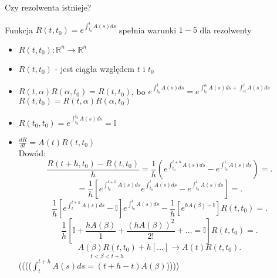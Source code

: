 \documentclass[../main.tex]{subfiles}
\begin{document}
    \begin{pytanie}
        Czy rezolwenta istnieje?
    \end{pytanie}
    Funkcja $R(t,t_0) = e^{\int_{t_0}^t A(s) ds}$ spełnia warunki $1-5$ dla rezolwenty
    \begin{itemize}
        \item $R(t,t_0): \mathbb{R}^n\to\mathbb{R}^n$
        \item $R(t,t_0)$ - jest ciągła względem $t$ i $t_0$
        \item $R(t,\alpha)R(\alpha,t_0) = R(t,t_0)$, bo $e^{\int_{t_0}^t A(s)d s} = e^{\int_{t_0}^\alpha A(s)d s+\int_{\alpha}^t A(s)d s}$\\
            $R(t,t_0) = R(t,\alpha)R(\alpha,t_0)$
        \item $R(t_0,t_0) = e^{\int_{t_0}^{t_0}A(s)d s} = \mathbb{I}$
        \item $\frac{dR}{dt}=A(t)R(t,t_0)$\\
            Dowód:
            \[
                \frac{R(t+h,t_0) -R(t,t_0)}{h} = \frac{1}{h}\left(e^{\int_{t_0}^{t+h}A(s)d s} - e^{\int_{t_0}^{t}A(s)d s}\right) =
            .\]
            \[
                =\frac{1}{h}\left[ e^{\int_{t_0}^{t+h}A(s)d s}e^{\int_{t_0}^{t}A(s)d s}-e^{\int_{t_0}^{t}A(s)d s} \right] =
            .\]
            \[
                \frac{1}{h}\left[ e^{\int_{t}^{t+h}A(s)d s}-\mathbb{I} \right] e^{\int_{t_0}^t A(s)d s} - \frac{1}{h}\left[ e^{hA(\beta) - \mathbb{I}} \right] R(t,t_0) =
            .\]
            \[
                \frac{1}{h}\left[ \mathbb{I}+\frac{hA(\beta)}{1} + \frac{(hA(\beta))^2}{2!}+\ldots = \mathbb{I} \right] R(t,t_0) =
            .\]
            \[
                \underset{t<\beta<t+h}{A(\beta)R(t,t_0)} + h[...]\to A(t)R(t,t_0)
            .\]
            (((($\int_{t}^{t+h}A(s)d s = (t+h-t)A(\beta)$))))
    \end{itemize}
\end{document}
